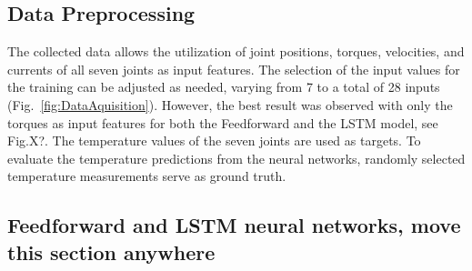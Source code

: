 \documentclass{ifacconf}
\begin{document}
\subsection{Data Preprocessing}
The collected data allows the utilization of joint positions, torques, velocities, and currents of all seven joints as input features.
The selection of the input values for the training can be adjusted as needed, varying from 7 to a total of 28 inputs (Fig.~\ref{fig:DataAquisition}). However, the best result was observed with only the torques as input features for both the Feedforward and the LSTM model, see Fig.X?. The temperature values of the seven joints are used as targets.
To evaluate the temperature predictions from the neural networks, randomly selected temperature measurements serve as ground truth.

\subsection{Feedforward and LSTM neural networks, move this section anywhere}
\end{document}
